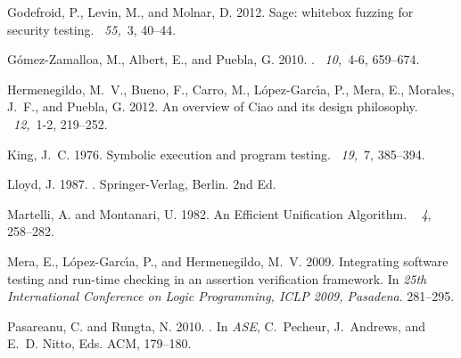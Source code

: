 \documentclass[fleqn]{tlp}
\begin{document}
\begin{thebibliography}{}
{\sc Godefroid, P.}, {\sc Levin, M.}, {\sc and} {\sc Molnar, D.} 2012.
\newblock Sage: whitebox fuzzing for security testing.
~{\em 55,\/}~3, 40--44.

{\sc G{\'o}mez-Zamalloa, M.}, {\sc Albert, E.}, {\sc and} {\sc Puebla, G.}
  2010.
.
~{\em 10,\/}~4-6, 659--674.

{\sc Hermenegildo, M.~V.}, {\sc Bueno, F.}, {\sc Carro, M.}, {\sc
  L{\'{o}}pez{-}Garc{\'{\i}}a, P.}, {\sc Mera, E.}, {\sc Morales, J.~F.}, {\sc
  and} {\sc Puebla, G.} 2012.
\newblock An overview of {C}iao and its design philosophy.
~{\em 12,\/}~1-2, 219--252.

{\sc King, J.~C.} 1976.
\newblock Symbolic execution and program testing.
~{\em 19,\/}~7, 385--394.

{\sc Lloyd, J.} 1987.
.
\newblock Springer-Verlag, Berlin.
\newblock 2nd Ed.

{\sc Martelli, A.} {\sc and} {\sc Montanari, U.} 1982.
\newblock An {E}fficient {U}nification {A}lgorithm.
~{\em
  4}, 258--282.

{\sc Mera, E.}, {\sc L{\'{o}}pez{-}Garc{\'{\i}}a, P.}, {\sc and} {\sc
  Hermenegildo, M.~V.} 2009.
\newblock Integrating software testing and run-time checking in an assertion
  verification framework.
\newblock In {\em 25th International Conference on Logic Programming, {ICLP}
  2009, Pasadena}. 281--295.

{\sc Pasareanu, C.} {\sc and} {\sc Rungta, N.} 2010.
.
\newblock In {\em ASE}, {C.~Pecheur}, {J.~Andrews}, {and} {E.~D. Nitto}, Eds.
  ACM, 179--180.


\end{thebibliography}
\end{document}
